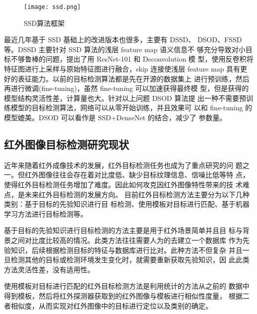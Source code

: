 \begin{figure}[htbp]
    \centering
    \texttt{[image: ssd.png]}
    \caption{SSD算法框架}
    \label{ssd}
\end{figure}

最近几年基于 SSD 基础上的改进版本也很多，主要有 DSSD\cite{fu2017dssd}、
DSOD\cite{shen2017dsod}、FSSD\cite{li2017fssd}等。DSSD 主要针对 SSD 算法的浅层 feature map 语义信息不
够充分导致对小目标不够鲁棒的问题，提出了用 ResNet-101 和 Deconvolution 模
型，使用反卷积将特征图进行上采样与原始特征图进行融合，skip 连接使浅层
feature map 具有更好的表征能力。以前的目标检测算法都是先在开源的数据集上
进行预训练，然后再进行微调(fine-tuning)，虽然 fine-tuning 可以加速获得最终模
型，但是获得的模型结构灵活性差，计算量也大。针对以上问题 DSOD 算法提
出一种不需要预训练模型的目标检测算法，网络可以从零开始训练，并且效果可
以和 fine-tuning 的模型媲美。DSOD 可以看作是 SSD+DenseNet 的结合，减少了
参数量。

\subsection{红外图像目标检测研究现状}
近年来随着红外成像技术的发展，红外目标检测任务也成为了重点研究的问
题之一。但红外图像往往会存在着对比度低、缺少目标纹理信息、信噪比低等特
点，使得红外目标检测任务增加了难度。因此如何攻克因红外图像特性带来的技
术难点，是未来红外目标检测的发展方向。
目前红外目标检测方法主要分为以下几种类别：基于目标的先验知识进行目
标检测、使用模板对目标进行匹配、基于机器学习方法进行目标检测等。

基于目标的先验知识进行目标检测的方法主要是用于红外场景简单并且目
标与背景之间对比度比较高的情况。此类方法往往需要人为的去建立一个数据库
作为先验知识，后续根据检测目标的特征与数据库进行比对。此种方法不但复杂
并且一旦检测其他的目标或检测环境发生变化时，就需要重新获取先验知识，因
此此类方法灵活性差，没有适用性。

使用模板对目标进行匹配的红外目标检测方法是利用统计的方法从之前的
数据中得到模板，然后将红外探测器获取到的红外图像与模板进行相似性度量，
根据二者相似度，从而实现对红外图像中的目标进行定位以及类别的确定\cite{宋曦2010一种基于模板匹配的目标识别方法}。

